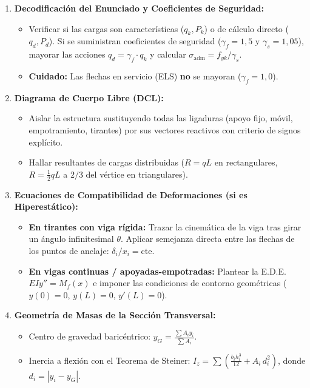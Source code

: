 \begin{enumerate}[label=\bfseries Paso \arabic*:]
    \item \textbf{Decodificación del Enunciado y Coeficientes de Seguridad:}
          \begin{itemize}
              \item Verificar si las cargas son características ($q_k, P_k$) o de cálculo directo ($q_d, P_d$). Si se suministran coeficientes de seguridad ($\gamma_f = 1{,}5$ y $\gamma_s = 1{,}05$), mayorar las acciones $q_d = \gamma_f \cdot q_k$ y calcular $\sigma_{\text{adm}} = f_{yk}/\gamma_s$.
              \item \textbf{Cuidado:} Las flechas en servicio (ELS) \textbf{no} se mayoran ($\gamma_f = 1{,}0$).
          \end{itemize}

    \item \textbf{Diagrama de Cuerpo Libre (DCL):}
          \begin{itemize}
              \item Aislar la estructura sustituyendo todas las ligaduras (apoyo fijo, móvil, empotramiento, tirantes) por sus vectores reactivos con criterio de signos explícito.
              \item Hallar resultantes de cargas distribuidas ($R = q L$ en rectangulares, $R = \frac{1}{2} q L$ a $2/3$ del vértice en triangulares).
          \end{itemize}

    \item \textbf{Ecuaciones de Compatibilidad de Deformaciones (si es Hiperestático):}
          \begin{itemize}
              \item \textbf{En tirantes con viga rígida:} Trazar la cinemática de la viga tras girar un ángulo infinitesimal $\theta$. Aplicar semejanza directa entre las flechas de los puntos de anclaje: $\delta_i / x_i = \text{cte}$.
              \item \textbf{En vigas continuas / apoyadas-empotradas:} Plantear la E.D.E. $EI y'' = M_f(x)$ e imponer las condiciones de contorno geométricas ($y(0)=0$, $y(L)=0$, $y'(L)=0$).
          \end{itemize}

    \item \textbf{Geometría de Masas de la Sección Transversal:}
          \begin{itemize}
              \item Centro de gravedad baricéntrico: $y_G = \frac{\sum A_i y_i}{\sum A_i}$.
              \item Inercia a flexión con el Teorema de Steiner: $I_z = \sum \left( \frac{b_i h_i^3}{12} + A_i \, d_i^2 \right)$, donde $d_i = |y_i - y_G|$.
          \end{itemize}


\end{enumerate}
